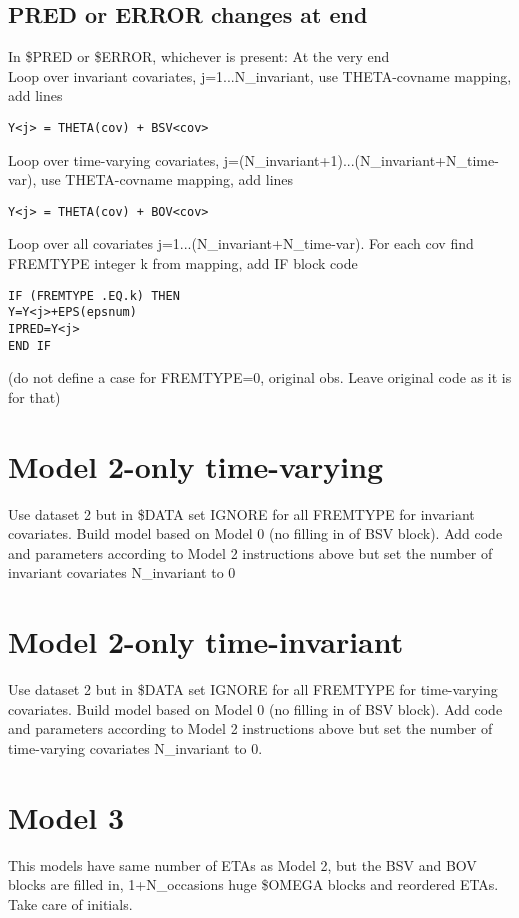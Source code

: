 \subsection{PRED or ERROR changes at end}
In \$PRED or \$ERROR, whichever is present:
At the very end\\
Loop over invariant covariates, j=1...N\_invariant, use THETA-covname mapping, add lines
\begin{verbatim}
Y<j> = THETA(cov) + BSV<cov>
\end{verbatim}
Loop over time-varying covariates, j=(N\_invariant+1)...(N\_invariant+N\_time-var), use THETA-covname mapping, add lines
\begin{verbatim}
Y<j> = THETA(cov) + BOV<cov>
\end{verbatim}
Loop over all covariates j=1...(N\_invariant+N\_time-var).
For each cov find FREMTYPE integer k from mapping, add IF block code 
\begin{verbatim}
IF (FREMTYPE .EQ.k) THEN
Y=Y<j>+EPS(epsnum)
IPRED=Y<j>
END IF
\end{verbatim}
(do not define a case for FREMTYPE=0, original obs. Leave original code as it is for that)


\section{Model 2-only time-varying}
Use dataset 2 but in \$DATA set IGNORE for all FREMTYPE for invariant covariates. Build model based on Model 0 (no filling in of BSV block). Add code and parameters according to Model 2 instructions above but set the number of invariant covariates N\_invariant to 0

\section{Model 2-only time-invariant}
Use dataset 2 but in \$DATA set IGNORE for all FREMTYPE for time-varying covariates. Build model based on Model 0 (no filling in of BSV block). Add code and parameters according to Model 2 instructions above but set the number of time-varying covariates N\_invariant to 0.

\section{Model 3}

This models have same number of ETAs as Model 2, but the BSV and BOV blocks are filled in, 1+N\_occasions huge \$OMEGA blocks and reordered ETAs. Take care of initials.

